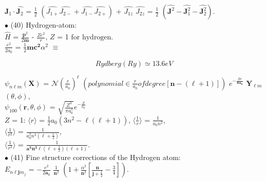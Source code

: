 \documentclass[a4paper, 10pt, onepage]{elegantbook}
\begin{document}
{$\hat{\mathbf J_1} \cdot \hat{\mathbf J_2}$ = $\frac{1}{2}$ $( \hat{\mathit J_{1 +}} \hat{\mathit J_{2 -}} + \hat{\mathit J_{1 -}} \hat{\mathit J_{2 +}})$ + $ \hat{\mathit J_{1z}}$ $\hat{\mathit J_{2z}}$ = $ \frac{1}{2}$ $(\hat{\mathbf J^2} - \hat{\mathbf J^2_1} - \hat{\mathbf J^2_2})$. \\

$\bullet$ (40) Hydrogen-atom:  \\

$\hat{H}$ = $ \frac{\hat{\mathbf p^2}} {2 {\mathbf m}}$ - $ \frac{\mathit Z e^2}{r}$, $ \mathit Z$ = 1 $\text{for hydrogen.}$  \\

$\frac{e^2}{2a_0}$ = $ \frac{1}{2} \mathbf {mc^2} \alpha^2$ $ \equiv$

\label{eq:Rydberg}
\begin{equation}
Rydberg(Ry)  \simeq 13.6 eV
\end{equation}

\noindent

$\psi_{n \ell m} (\mathbf X)$ = $\mathcal N ( \frac{r}{a_0})^\ell$ $ ( polynomial \in {\frac{r}{a_0}} of degree [{\mathbf {n} - (\ell + 1)}])$ $ e^{- \frac{\mathit Zr} {\mathbf {n a_0}}}$ $\mathbf Y_{\ell m}$  \\

 $(\theta, \phi)$, \\

$\psi_{100} ( \mathbf r, \theta, \phi)$ = ${\sqrt{\frac{\mathit{Z^3}}{\pi {a^3_0}}}} e^{- \frac{ \mathit{Z}}{a_0}}$ \\

$\mathit Z$ = 1: $ \langle r \rangle$ = $ \frac{1}{2} a_0(3n^2 - \ell(\ell + 1))$, $ \langle \frac{1}{r} \rangle$ = $\frac{1}{a_0 n^2}$,  \\

$\langle \frac{1}{r^2} \rangle$ = $ \frac{1}{a^2_0 n^3 (\ell + \frac{1}{2})}$, \\

$ \langle \frac{1}{r^3} \rangle$ = $ \frac{1}{\mathbf {a^3 n^3} \ell (\ell + \frac{1}{2}) (\ell + 1)}$.  \\

$\bullet$ (41) Fine structure corrections of the Hydrogen atom:  \\

$\mathit E_{n \ell {\mathbf j m_j}}$ = $ - \frac{e^2}{2 \mathbf a_0}$ $ \frac{1}{\mathbf n^2}$ $ (1 + \frac{\alpha^2}{\mathbf n^2} [\frac{\mathbf n}{\mathbf j + \frac{1}{2}} - \frac{3}{4}])$.  \\

}
\end{document}
